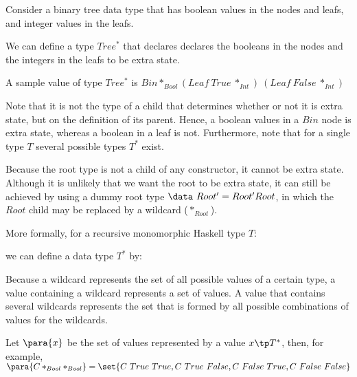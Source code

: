 Consider a binary tree data type that has boolean values in the nodes and leafs, and integer values in the leafs.


We can define a type $Tree^*$ that declares declares the booleans in the nodes and the integers in the leafs to be extra state.


A sample value of type $Tree^*$ is $Bin *_{Bool} (Leaf~True~*_{Int})~(Leaf~False~*_{Int})$ 


Note that it is not the type of a child that determines whether or not it is extra state, but on the definition of its parent. Hence, a boolean values in a $Bin$ node is extra state, whereas a boolean in a leaf is not. Furthermore, note that for a single type $T$ several possible types $T^*$ exist.

Because the root type is not a child of any constructor, it cannot be extra state. Although it is unlikely that we want the root to be extra state, it can still be achieved by using a dummy root type $\data~Root' = Root' Root$, in which the $Root$ child may be replaced by a wildcard ($*_{Root}$).  

More formally, for a recursive monomorphic Haskell type $T$:


we can define a data type $T^*$ by:


Because a wildcard represents the set of all possible values of a certain type, a value containing a wildcard represents a set of values. A value that contains several wildcards represents the set that is formed by all possible combinations of values for the wildcards. 

Let  $\para{x}$ be the set of values represented by a value $x \tp T^*$, then, for example,  $\para{C *_{Bool} *_{Bool}} = \set{C~True~True, C~True~False, C~False~True,C~False~False}$

